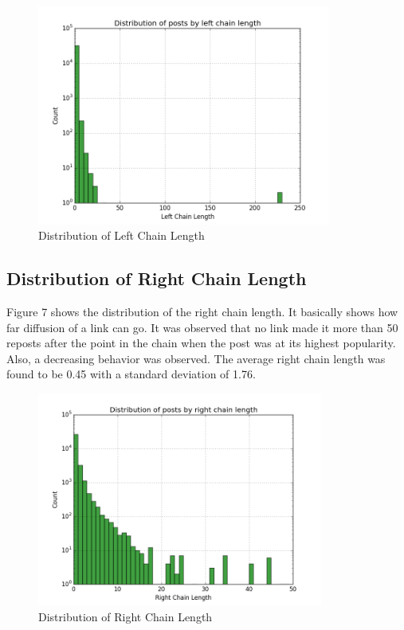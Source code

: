 \documentclass{article} %
\begin{document}
\begin{figure}[h]
\begin{center}
\includegraphics[width=3.8in]{left_chain.png}
\caption{Distribution of Left Chain Length}
\end{center}
\end{figure}

\subsection{Distribution of Right Chain Length}

Figure 7 shows the distribution of the right chain length. It basically shows how far diffusion of a link can go. It was observed that no link made it more than 50 reposts after the point in the chain when the post was at its highest popularity. Also, a decreasing behavior was observed. 
The average right chain length was found to be 0.45 with a standard deviation of 1.76.

\begin{figure}[h]
\begin{center}
\includegraphics[width=3.7in]{right_chain.png}
\caption{Distribution of Right Chain Length}
\end{center}
\end{figure}
\end{document}
